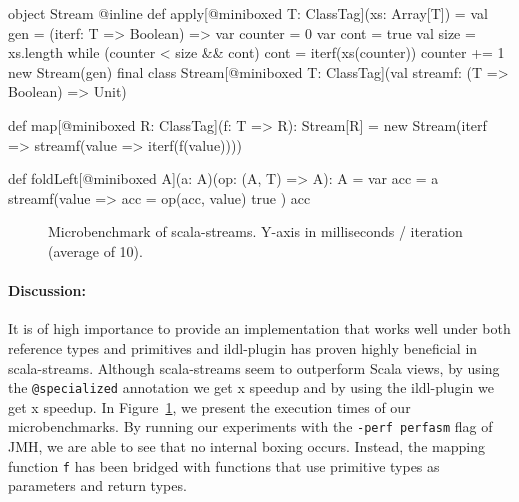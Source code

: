 \begin{lstlisting-nobreak}[language=scala, caption=Creation of a stream \& examples of
  operators., label=lst:operators]
object Stream {
  @inline def apply[@miniboxed T: ClassTag](xs: Array[T]) = {
    val gen = (iterf: T => Boolean) => {
      var counter = 0
      var cont = true
      val size = xs.length
      while (counter < size && cont) {
        cont = iterf(xs(counter))
        counter += 1
      }
    }
  }
  new Stream(gen)
}
final class Stream[@miniboxed T: ClassTag](val streamf: (T => Boolean) => Unit) {
  def map[@miniboxed R: ClassTag](f: T => R): Stream[R] =
    new Stream(iterf => streamf(value => iterf(f(value))))

  def foldLeft[@miniboxed A](a: A)(op: (A, T) => A): A = {
    var acc = a
    streamf(value => {
      acc = op(acc, value)
      true
    })
    acc
  }
}
\end{lstlisting-nobreak}
\begin{figure}
  \centering
  \caption{Microbenchmark of scala-streams. Y-axis in milliseconds / iteration (average of 10).}
  \label{fig:stream_benchmarks}
\end{figure}
\paragraph{Discussion: }  It is of high importance to provide an implementation
that works well under both reference types and primitives and ildl-plugin has
proven highly beneficial in scala-streams. Although scala-streams seem to
outperform Scala views, by using the \verb|@specialized| annotation we get
x speedup and by using the ildl-plugin we get x
speedup. In Figure~\ref{fig:stream_benchmarks}, we present the execution times
of our microbenchmarks. By running our experiments with the \verb|-perf perfasm|
flag of JMH, we are able to see that no internal boxing occurs. Instead, the
mapping function \verb|f| has been bridged with functions that use primitive
types as parameters and return types.



